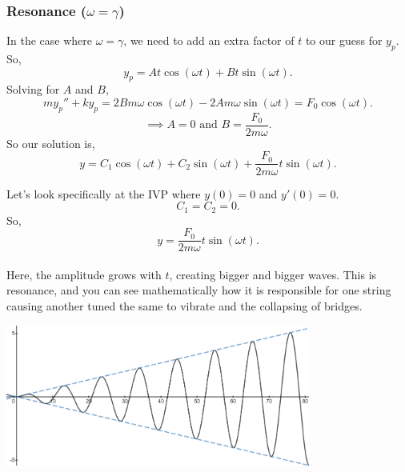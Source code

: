 \subsubsection{Resonance ($\omega = \gamma$)}
\noindent
In the case where $\omega = \gamma$, we need to add an extra factor of $t$ to our guess for $y_p$.
So,
\begin{equation*}
	y_p = At\cos{(\omega t)} + Bt\sin{(\omega t)}.
\end{equation*}
Solving for $A$ and $B$,
\begin{equation*}
	my_p'' + ky_p = 2Bm\omega\cos{(\omega t)} - 2Am\omega\sin{(\omega t)} = F_0\cos{(\omega t)}.
\end{equation*}
\begin{equation*}
	\implies A = 0 \text{ and } B = \frac{F_0}{2m\omega}.
\end{equation*}
So our solution is,
\begin{equation*}
	y = C_1\cos{(\omega t)} + C_2\sin{(\omega t)} + \frac{F_0}{2m\omega}t\sin{(\omega t)}.
\end{equation*}

\noindent
Let's look specifically at the IVP where $y(0) = 0$ and $y'(0) = 0$.
\begin{equation*}
	C_1 = C_2 = 0.
\end{equation*}
So,
\begin{equation*}
	y = \frac{F_0}{2m\omega}t\sin{(\omega t)}.
\end{equation*}\\

\noindent
Here, the amplitude grows with $t$, creating bigger and bigger waves.
This is resonance, and you can see mathematically how it is responsible for one string causing another tuned the same to vibrate and the collapsing of bridges.

\begin{center}
	\includegraphics[width=0.75\textwidth]{./higherOrder/forcedVibrs/resonance.png}
\end{center}